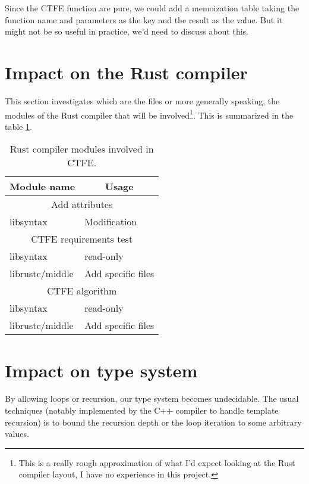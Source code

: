 \documentclass[a4paper,11pt]{article}
\begin{document}
Since the CTFE function are pure, we could add a memoization table taking the function name and parameters as the key and the result as the value. But it might not be so useful in practice, we'd need to discuss about this.

\section{Impact on the Rust compiler}
\label{impact-rust-compiler}

This section investigates which are the files or more generally speaking, the modules of the Rust compiler that will be involved\footnote{This is a really rough approximation of what I'd expect looking at the Rust compiler layout, I have no experience in this project.}. This is summarized in the table \ref{rust-changes}.
\newline

\begin{table}[h!]
\begin{tabular}{| l | l |} \hline 
\multicolumn{1}{|c|}{\textbf{Module name}} & \multicolumn{1}{|c|}{\textbf{Usage}} \\ \hline
\multicolumn{2}{|c|}{Add attributes} \\ \hline
libsyntax & Modification \\ \hline
\multicolumn{2}{|c|}{CTFE requirements test} \\ \hline
libsyntax & read-only \\ \hline
librustc/middle & Add specific files \\ \hline
\multicolumn{2}{|c|}{CTFE algorithm} \\ \hline
libsyntax & read-only \\ \hline
librustc/middle & Add specific files \\ \hline
\end{tabular}
\centering
\caption{Rust compiler modules involved in CTFE.}
\label{rust-changes}
\end{table}

\section{Impact on type system}
\label{impact-type}

By allowing loops or recursion, our type system becomes undecidable. The usual techniques (notably implemented by the C++ compiler to handle template recursion) is to bound the recursion depth or the loop iteration to some arbitrary values.
\end{document}

